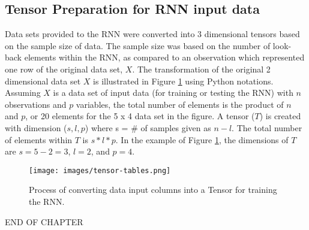 \subsection{Tensor Preparation for RNN input data}
Data sets provided to the RNN were converted into 3 dimensional tensors based on the sample size of data. The sample size was based on the number of look-back elements within the RNN, as compared to an observation which represented one row of the original data set, $X$.  The transformation of the original 2 dimensional data set $X$ is illustrated in Figure \ref{fig:tensor-tables} using Python notations. Assuming $X$ is a data set of input data (for training or testing the RNN) with $n$ observations and $p$ variables, the total number of elements is the product of $n$ and $p$, or 20 elements for the 5 x 4 data set in the figure. A tensor ($T$) is created with dimension ($s, l, p$) where s = \# of samples given as $n - l$. The total number of elements within $T$ is $s*l*p$. In the example of Figure \ref{fig:tensor-tables}, the dimensions of $T$ are $s = 5 - 2 = 3$, $l = 2$, and $p = 4$.    
%
\begin{figure}[H]
\centering
\texttt{[image: images/tensor-tables.png]}
\caption{Process of converting data input columns into a Tensor for training the RNN.}
\label{fig:tensor-tables}
\end{figure}

\bigskip

\begin{center}
END OF CHAPTER
\end{center}